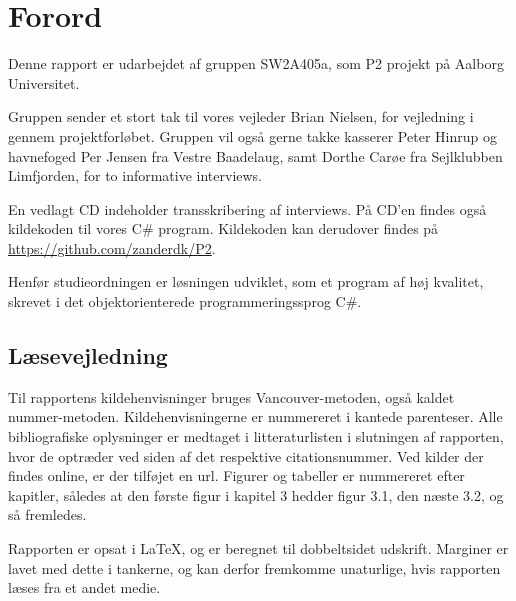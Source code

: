 \chapter*{Forord}
Denne rapport er udarbejdet af gruppen SW2A405a, som P2 projekt på Aalborg Universitet.

Gruppen sender et stort tak til vores vejleder Brian Nielsen, for vejledning i gennem projektforløbet. Gruppen vil også gerne takke kasserer Peter Hinrup og havnefoged Per Jensen fra Vestre Baadelaug, samt Dorthe Carøe fra Sejlklubben Limfjorden, for to informative interviews.

En vedlagt CD indeholder transskribering af interviews. På CD'en findes også kildekoden til vores C\# program. Kildekoden kan derudover findes på \url{https://github.com/zanderdk/P2}.


Henfør studieordningen er løsningen udviklet, som et program af høj kvalitet, skrevet i det objektorienterede programmeringssprog C\#.

\section*{Læsevejledning}
Til rapportens kildehenvisninger bruges Vancouver-metoden, også kaldet nummer-metoden. Kildehenvisningerne er nummereret i kantede parenteser. Alle bibliografiske oplysninger er medtaget i litteraturlisten i slutningen af rapporten, hvor de optræder ved siden af det respektive citationsnummer. Ved kilder der findes online, er der tilføjet en url. Figurer og tabeller er nummereret efter kapitler, således at den første figur i kapitel 3 hedder figur 3.1, den næste 3.2, og så fremledes.

Rapporten er opsat i \LaTeX{}, og er beregnet til dobbeltsidet udskrift. Marginer er lavet med dette i tankerne, og kan derfor fremkomme unaturlige, hvis rapporten læses fra et andet medie.
